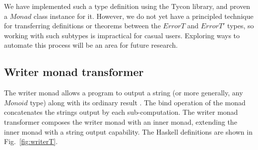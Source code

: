 \documentclass{sigplanconf}
\newcommand{\hsc}[1]{\ensuremath{\mathit{#1}}}
\theoremstyle{definition}
\begin{document}
We have implemented such a type definition using the Tycon library, and proven a \hsc{Monad} class instance for it. However, we do not yet have a principled technique for transferring definitions or theorems between the \hsc{ErrorT} and \hsc{ErrorT'} types, so working with such subtypes is impractical for casual users. Exploring ways to automate this process will be an area for future research.

\subsection{Writer monad transformer}

The writer monad allows a program to output a string (or more generally, any \hsc{Monoid} type) along with its ordinary result \cite{Jones1995}. The bind operation of the monad concatenates the strings output by each sub-computation. The writer monad transformer composes the writer monad with an inner monad, extending the inner monad with a string output capability. The Haskell definitions are shown in Fig.~\ref{fig:writerT}.
\end{document}
